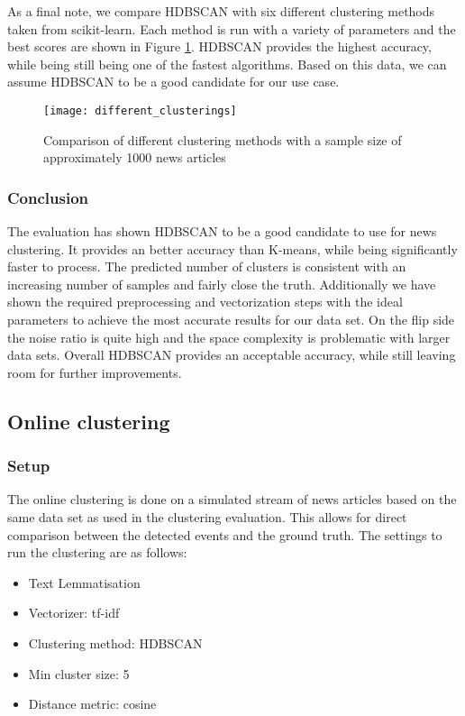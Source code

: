 As a final note, we compare HDBSCAN with six different clustering methods taken from scikit-learn. Each method is run with a variety of parameters and the best scores are shown in Figure \ref{fig:different_clusterings}. HDBSCAN provides the highest accuracy, while being still being one of the fastest algorithms. Based on this data, we can assume HDBSCAN to be a good candidate for our use case.

\begin{figure}[h]
    \centering
    \texttt{[image: different\_clusterings]}
    \caption{Comparison of different clustering methods with a sample size of approximately 1000 news articles}
    \label{fig:different_clusterings}
\end{figure}

\subsubsection{Conclusion}

The evaluation has shown HDBSCAN to be a good candidate to use for news clustering. It provides an better accuracy than K-means, while being significantly faster to process. The predicted number of clusters is consistent with an increasing number of samples and fairly close the truth. Additionally we have shown the required preprocessing and vectorization steps with the ideal parameters to achieve the most accurate results for our data set. On the flip side the noise ratio is quite high and the space complexity is problematic with larger data sets. Overall HDBSCAN provides an acceptable accuracy, while still leaving room for further improvements.

\subsection{Online clustering}

\subsubsection{Setup}

The online clustering is done on a simulated stream of news articles based on the same data set as used in the clustering evaluation. This allows for direct comparison between the detected events and the ground truth. The settings to run the clustering are as follows:

\begin{itemize}
    \item Text Lemmatisation
    \item Vectorizer: tf-idf
    \item Clustering method: HDBSCAN
    \item Min cluster size: 5
    \item Distance metric: cosine
\end{itemize}

